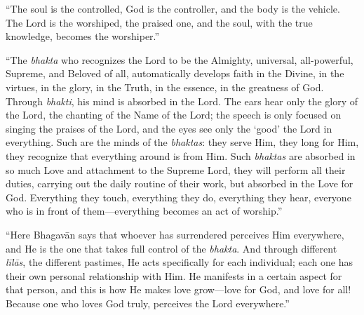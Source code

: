 \enquote{The soul is the controlled, God is the controller, and the body is the vehicle. The Lord is the worshiped, the praised one, and the soul, with the true knowledge, becomes the worshiper.}

\enquote{The \textit{bhakta} who recognizes the Lord to be the Almighty, universal, all-powerful, Supreme, and Beloved of all, automatically develops faith in the Divine, in the virtues, in the glory, in the Truth, in the essence, in the greatness of God. Through \textit{bhakti}, his mind is absorbed in the Lord. The ears hear only the glory of the Lord, the chanting of the Name of the Lord; the speech is only focused on singing the praises of the Lord, and the eyes see only the \enquote{good} the Lord in everything. Such are the minds of the \textit{bhaktas}: they serve Him, they long for Him, they recognize that everything around is from Him. Such \textit{bhaktas} are absorbed in so much Love and attachment to the Supreme Lord, they will perform all their duties, carrying out the daily routine of their work, but absorbed in the Love for God. Everything they touch, everything they do, everything they hear, everyone who is in front of them---everything becomes an act of worship.}

\enquote{Here Bhagavān says that whoever has surrendered perceives Him everywhere, and He is the one that takes full control of the \textit{bhakta}. And through different \textit{līlās}, the different pastimes, He acts specifically for each individual; each one has their own personal relationship with Him. He manifests in a certain aspect for that person, and this is how He makes love grow---love for God, and love for all! Because one who loves God truly, perceives the Lord everywhere.}

